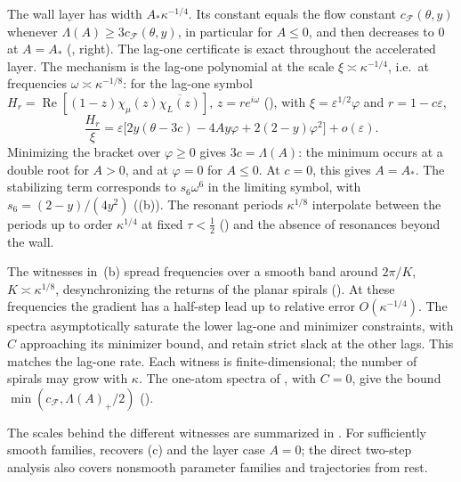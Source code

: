 \documentclass[11pt]{article}
\theoremstyle{definition}
\theoremstyle{remark}
\newcommand{\cF}{\mathcal F}
\newcommand{\Rea}{\operatorname{Re}}
\newcommand{\cFF}{c_{\cF}}
\begin{document}
The wall layer has width \(A_*\kappa^{-1/4}\).  Its constant equals the flow constant
\(\cFF(\theta,y)\) whenever \(\Lambda(A)\ge3\cFF(\theta,y)\), in particular for \(A\le0\),
and then decreases to \(0\) at \(A=A_*\) (, right).
The lag-one certificate is exact throughout the accelerated layer.  The mechanism is the lag-one polynomial at
the scale \(\xi\asymp\kappa^{-1/4}\), i.e.\ at frequencies \(\omega\asymp\kappa^{-1/8}\): for the lag-one symbol
\(H_r=\Rea[(1-z)\chi_\mu(z)\overline{\chi_L(z)}]\), \(z=re^{i\omega}\) (), with
\(\xi=\varepsilon^{1/2}\varphi\) and \(r=1-c\varepsilon\),
\[
\frac{H_r}{\xi}=\varepsilon\bigl[2y(\theta-3c)-4Ay\varphi+2(2-y)\varphi^2\bigr]+o(\varepsilon).
\]
Minimizing the bracket over \(\varphi\ge0\) gives \(3c=\Lambda(A)\): the minimum occurs at a double root
for \(A>0\), and at \(\varphi=0\) for \(A\le0\).  At \(c=0\), this gives \(A=A_*\).
The stabilizing term corresponds to \(s_6\omega^6\) in the limiting symbol,
with \(s_6=(2-y)/(4y^2)\) ((b)).
The resonant periods \(\kappa^{1/8}\) interpolate between the periods up to
order \(\kappa^{1/4}\) at fixed \(\tau<\frac12\) () and the absence
of resonances beyond the wall.

The witnesses in~(b) spread frequencies over a smooth band around \(2\pi/K\),
\(K\asymp\kappa^{1/8}\), desynchronizing the returns of the planar spirals
().  At these frequencies the gradient has a half-step lead up to
relative error \(O(\kappa^{-1/4})\).  The spectra asymptotically saturate the lower lag-one
and minimizer constraints, with \(C\) approaching its minimizer bound, and retain strict slack
at the other lags.  This matches the lag-one rate.  Each witness is finite-dimensional;
the number of spirals may grow with \(\kappa\).
The one-atom spectra of , with \(C=0\), give the bound
\(\min(\cFF,\Lambda(A)_+/2)\) ().

The scales behind the different witnesses are summarized in .
For sufficiently smooth families,  recovers (c)
and the layer case \(A=0\);
the direct two-step analysis also covers nonsmooth parameter families and trajectories from rest.
\end{document}
